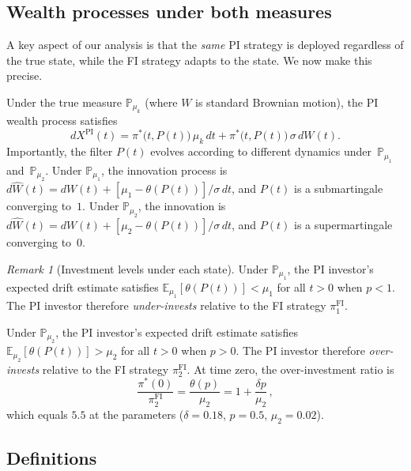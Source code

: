 \documentclass[12pt]{article}
\theoremstyle{remark}
\newtheorem{remark}[theorem]{Remark}
\theoremstyle{definition}
\newcommand{\E}{\mathbb{E}}
\newcommand{\Prob}{\mathbb{P}}
\newcommand{\FI}{\mathrm{FI}}
\newcommand{\PI}{\mathrm{PI}}
\newcommand{\What}{\widehat{W}}
\begin{document}
\subsection{Wealth processes under both measures}
\label{sec:wealth_both}

A key aspect of our analysis is that the \emph{same} PI strategy is
deployed regardless of the true state, while the FI strategy adapts to
the state.
We now make this precise.

Under the true measure $\Prob_{\mu_k}$ (where $W$ is standard Brownian
motion), the PI wealth process satisfies
\begin{equation}\label{eq:XPI}
  dX^{\PI}(t) = \pi^*\bigl(t, P(t)\bigr)\,\mu_k\,dt
              + \pi^*\bigl(t, P(t)\bigr)\,\sigma\,dW(t).
\end{equation}
Importantly, the filter $P(t)$ evolves according to
different dynamics under~$\Prob_{\mu_1}$ and~$\Prob_{\mu_2}$.
Under $\Prob_{\mu_1}$, the innovation process is
$d\What(t) = dW(t) + [\mu_1 - \theta(P(t))]/\sigma\,dt$,
and $P(t)$ is a submartingale converging to~$1$.
Under $\Prob_{\mu_2}$, the innovation is
$d\What(t) = dW(t) + [\mu_2 - \theta(P(t))]/\sigma\,dt$,
and $P(t)$ is a supermartingale converging to~$0$.

\begin{remark}[Investment levels under each state]
\label{rem:investment}
Under $\Prob_{\mu_1}$, the PI investor's expected drift estimate
satisfies $\E_{\mu_1}[\theta(P(t))] < \mu_1$ for all $t > 0$ when
$p < 1$.
The PI investor therefore \emph{under-invests} relative to the FI
strategy $\pi_1^{\FI}$.

Under $\Prob_{\mu_2}$, the PI investor's expected drift estimate
satisfies $\E_{\mu_2}[\theta(P(t))] > \mu_2$ for all $t > 0$ when
$p > 0$.
The PI investor therefore \emph{over-invests} relative to the FI
strategy $\pi_2^{\FI}$.
At time zero, the over-investment ratio is
\begin{equation}\label{eq:over_invest}
  \frac{\pi^*(0)}{\pi_2^{\FI}} = \frac{\theta(p)}{\mu_2}
  = 1 + \frac{\delta p}{\mu_2}\,,
\end{equation}
which equals $5.5$ at the \citeauthor{HuangSun2025} parameters
($\delta = 0.18$, $p = 0.5$, $\mu_2 = 0.02$).
\end{remark}

\subsection{Definitions}\label{sec:definitions}
\end{document}
